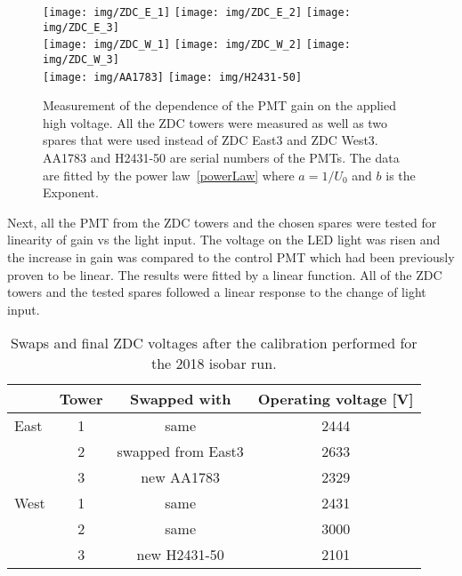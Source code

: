 \begin{figure}[!htb]
\texttt{[image: img/ZDC\_E\_1]}
\texttt{[image: img/ZDC\_E\_2]}
\texttt{[image: img/ZDC\_E\_3]}\\
\texttt{[image: img/ZDC\_W\_1]}
\texttt{[image: img/ZDC\_W\_2]}
\texttt{[image: img/ZDC\_W\_3]}\\
\texttt{[image: img/AA1783]}
\texttt{[image: img/H2431-50]}
\caption{\label{ZDCgains}Measurement of the dependence of the PMT gain on the applied high voltage. All the ZDC towers were measured as well as two spares that were used instead of ZDC East3 and ZDC West3\@. AA1783 and H2431-50 are serial numbers of the PMTs. The data are fitted by the power law~\eqref{powerLaw} where $a=1/U_0$ and $b$ is the Exponent.}
\end{figure}

Next, all the PMT from the ZDC towers and the chosen spares were tested for linearity of gain vs the light input. The voltage on the LED light was risen and the increase in gain was compared to the control PMT which had been previously proven to be linear. The results were fitted by a linear function. All of the ZDC towers and the tested spares followed a linear response to the change of light input.


\begin{table}[!htb] 
\caption{\label{HVtable}Swaps and final ZDC voltages after the calibration performed for the 2018 isobar run.}
\label{corected}
\begin{center}
\begin{tabular}{lccc}
\toprule
 &Tower&Swapped with&Operating voltage [V]\\
\midrule
East  &1 & same & 2444 \\
      &2 & swapped from East3 & 2633 \\
      &3 & new AA1783 & 2329 \\
\midrule
West  &1 & same & 2431  \\
      &2 & same & 3000  \\
      &3 & new H2431-50 & 2101 \\
\bottomrule
\end{tabular}
\end{center}
\end{table}


